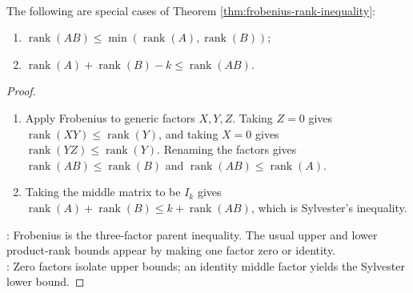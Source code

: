\begin{corollary} \label{cor:frobenius-rank-inequality-special-cases} \\
The following are special cases of Theorem \ref{thm:frobenius-rank-inequality}:
\begin{enumerate}[label=(\roman*)]
\setlength{\itemsep}{0pt}
\item
$\operatorname{rank}(AB)\leq\min(\operatorname{rank}(A),\operatorname{rank}(B))$;
\item
$\operatorname{rank}(A)+\operatorname{rank}(B)-k\leq\operatorname{rank}(AB)$.
\end{enumerate}
\begin{proof}
\begin{enumerate}[label=(\roman*)]
\setlength{\itemsep}{0pt}
\item
Apply Frobenius to generic factors $X,Y,Z$. Taking $Z=0$ gives $\operatorname{rank}(XY)\leq\operatorname{rank}(Y)$, and taking $X=0$ gives $\operatorname{rank}(YZ)\leq\operatorname{rank}(Y)$. Renaming the factors gives $\operatorname{rank}(AB)\leq\operatorname{rank}(B)$ and $\operatorname{rank}(AB)\leq\operatorname{rank}(A)$.
\item
Taking the middle matrix to be $I_k$ gives $\operatorname{rank}(A)+\operatorname{rank}(B)\leq k+\operatorname{rank}(AB)$, which is Sylvester's inequality.
\end{enumerate}
: Frobenius is the three-factor parent inequality. The usual upper and lower product-rank bounds appear by making one factor zero or identity.\\
: Zero factors isolate upper bounds; an identity middle factor yields the Sylvester lower bound.
\end{proof}
\end{corollary}


